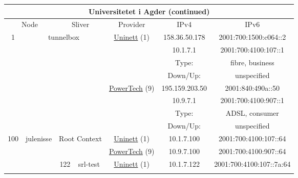 \begin{small}
\begin{center}
\begin{longtable}{|c|c|c|c|c|c|c|c|}
\endfirsthead
\hline
 \multicolumn{8}{|c|}{\textbf{Universitetet i Agder (continued)}} \\ \hline
 \multicolumn{2}{|p{8em}|}{Node} & \multicolumn{2}{|p{8em}|}{Sliver} & \multicolumn{2}{|p{8em}|}{Provider} & IPv4 & IPv6 \\ \hline
\endhead
 \multirow{8}{*}{\tiny{1}} & \multicolumn{3}{|c|}{\multirow{8}{*}{\tiny{tunnelbox}}} & \multicolumn{2}{|c|}{\multirow{4}{*}{\tiny{\href{https://www.uninett.no}{Uninett} (1)}}} & \tiny{158.36.50.178} & \tiny{2001:700:1500:c064::2} \\* \cline{7-7}\cline{8-8}
  & \multicolumn{3}{|c|}{} & \multicolumn{2}{|c|}{} & \tiny{10.1.7.1} & \tiny{2001:700:4100:107::1} \\* \cline{7-7}\cline{8-8}
  & \multicolumn{3}{|c|}{} & \multicolumn{2}{|c|}{} & Type: & fibre, business \\* \cline{7-7}\cline{8-8}
  & \multicolumn{3}{|c|}{} & \multicolumn{2}{|c|}{} & Down/Up:  & unspecified \\* \cline{5-5}\cline{6-6}\cline{7-7}\cline{8-8}
  & \multicolumn{3}{|c|}{} & \multicolumn{2}{|c|}{\multirow{4}{*}{\tiny{\href{http://www.powertech.no}{PowerTech} (9)}}} & \tiny{195.159.203.50} & \tiny{2001:840:490a::50} \\* \cline{7-7}\cline{8-8}
  & \multicolumn{3}{|c|}{} & \multicolumn{2}{|c|}{} & \tiny{10.9.7.1} & \tiny{2001:700:4100:907::1} \\* \cline{7-7}\cline{8-8}
  & \multicolumn{3}{|c|}{} & \multicolumn{2}{|c|}{} & Type: & ADSL, consumer \\* \cline{7-7}\cline{8-8}
  & \multicolumn{3}{|c|}{} & \multicolumn{2}{|c|}{} & Down/Up:  & unspecified \\ \hline
 \multirow{24}{*}{\tiny{100}} & \multicolumn{1}{|l|}{\multirow{24}{*}{\tiny{julenisse}}} & \multicolumn{2}{|c|}{\multirow{2}{*}{\tiny{Root Context}}} & \multicolumn{2}{|c|}{\tiny{\href{https://www.uninett.no}{Uninett} (1)}} & \tiny{10.1.7.100} & \tiny{2001:700:4100:107::64} \\* \cline{5-5}\cline{6-6}\cline{7-7}\cline{8-8}
  &  & \multicolumn{2}{|c|}{} & \multicolumn{2}{|c|}{\tiny{\href{http://www.powertech.no}{PowerTech} (9)}} & \tiny{10.9.7.100} & \tiny{2001:700:4100:907::64} \\* \cline{3-3}\cline{4-4}\cline{5-5}\cline{6-6}\cline{7-7}\cline{8-8}
  &  & \multirow{2}{*}{\tiny{122}} & \multicolumn{1}{|l|}{\multirow{2}{*}{\tiny{srl-test}}} & \multicolumn{2}{|c|}{\tiny{\href{https://www.uninett.no}{Uninett} (1)}} & \tiny{10.1.7.122} & \tiny{2001:700:4100:107::7a:64} \\* \cline{5-5}\cline{6-6}\cline{7-7}\cline{8-8}

\end{longtable}
\end{center}
\end{small}
